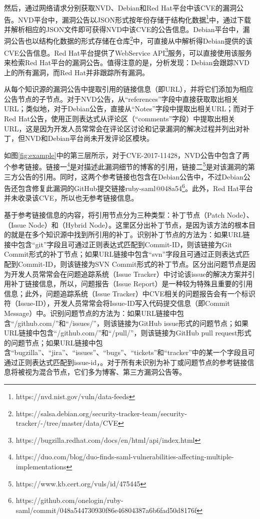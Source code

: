 然后，\tool 通过网络请求分别获取NVD、Debian和Red Hat平台中该CVE的漏洞公告。NVD平台中，漏洞公告以JSON形式按年份存储于结构化数据\footnote{https://nvd.nist.gov/vuln/data-feeds}中，\tool 通过下载并解析相应的JSON文件即可获得NVD中该CVE的公告信息。Debian平台中，漏洞公告也以结构化数据的形式存储在仓库\footnote{https://salsa.debian.org/security-tracker-team/security-tracker/-/tree/master/data/CVE}中，\tool 可直接从中解析得Debian提供的该CVE公告信息。Red Hat平台提供了WebService API\footnote{https://bugzilla.redhat.com/docs/en/html/api/index.html}服务，\tool 可以直接使用该服务来检索Red Hat平台的漏洞公告。值得注意的是，分析发现：Debian会跟踪NVD上的所有漏洞，而Red Hat并非跟踪所有漏洞。

\tool 从每个知识源的漏洞公告中提取引用的链接信息（即URL），并将它们添加为相应公告节点的子节点。对于NVD公告，\tool 从“references”字段中直接获取取出相关URL；类似地，对于Debian公告，\tool 直接从“Notes”字段中提取出相关URL；而对于Red Hat公告，\tool 使用正则表达式从评论区（“comments”字段）中提取出相关URL，这是因为开发人员常常会在评论区讨论和记录漏洞的解决过程并列出对补丁，但NVD和Debian平台尚未开发评论区模块。

\begin{exmp}
如图\ref{fig:example}中的第三层所示，对于CVE-2017-11428，NVD公告中包含了两个参考链接。链接一\footnote{https://duo.com/blog/duo-finds-saml-vulnerabilities-affecting-multiple-implementations}是对描述此漏洞细节的博客的引用，链接二\footnote{https://www.kb.cert.org/vuls/id/475445}是对该漏洞的第三方公告的引用。同时，这两个参考链接也包含在Debian公告中，不过Debian公告还包含修复此漏洞的GitHub提交链接ruby-saml@048a54\footnote{https://github.com/onelogin/ruby-saml/commit/048a544730930f86e46804387a6b6fad50d8176f}。此外，Red Hat平台并未收录该CVE，所以也无参考链接信息。
\end{exmp}

\tool 基于参考链接信息的内容，将引用节点分为三种类型：补丁节点（Patch Node）、（Issue Node）和（Hybrid Node）。这里区分出补丁节点，是因为该方法的根本目的就是在多个知识源中找到所引用的补丁。识别补丁节点的方法为：如果URL链接中包含“git”字段且可通过正则表达式匹配到Commit-ID，则该链接为Git Commit形式的补丁节点；如果URL链接中包含“svn”字段且可通过正则表达式匹配到Commit-ID，则该链接为SVN Commit形式的补丁节点。区分出问题节点是因为开发人员常常会在问题追踪系统（Issue Tracker）中讨论该issue的解决方案并引用补丁链接信息，所以，问题报告（Issue Report）是一种较为特殊且重要的引用信息；此外，问题追踪系统（Issue Tracker）中CVE相关的问题报告会有一个标识符（Issue-ID），开发人员常常会将Issue-ID写入代码提交信息（即Commit Message）中。识别问题节点的方法为：如果URL链接中包含“/github.com/”和“/issues/”，则该链接为GitHub issue形式的问题节点；如果URL链接中包含“/github.com/”和“/pull/”，则该链接为GitHub pull request形式的问题节点；如果URL链接中包含“bugzilla”、“jira”、“issues”、“bugs”、“tickets”和“tracker”中的某一个字段且可通过正则表达式匹配到issue-id，。对于所有未识别为补丁或问题节点的参考链接信息将被视为混合节点，它们多为博客、第三方漏洞公告等。

